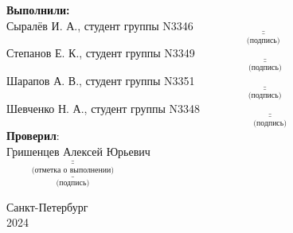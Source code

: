 \vfill
 \begin{flushright}
    \hfill \textbf{Выполнили:}\\
    \vspace{15pt}
    \noindent Сыралёв И. А., студент группы N3346 \hfill $\underset{\text{(подпись)}}{\underline{\underline{\hspace{5cm}}}}$\\
    \vspace{15pt}
    \noindent Степанов Е. К., студент группы N3349 \hfill $\underset{\text{(подпись)}}{\underline{\underline{\hspace{5cm}}}}$\\
    \vspace{15pt}
    \noindent Шарапов А. В., студент группы N3351 \hfill $\underset{\text{(подпись)}}{\underline{\underline{\hspace{5cm}}}}$\\
    \vspace{15pt}
    \noindent Шевченко Н. А., студент группы N3348 \hfill $\underset{\text{(подпись)}}{\underline{\underline{\hspace{5cm}}}}$\\
    \vspace{15pt}
    \textbf{Проверил}: \\
    \vspace{10pt}
    \hfill {Гришенцев Алексей Юрьевич}\\
    \vspace{10pt}
    $\underset{\text{(отметка о выполнении)}}{\underline{\underline{\hspace{5cm}}}}$\\
    \vspace{22pt}
    $\underset{\text{(подпись)}}{\underline{\hspace{5cm}}}$
 \end{flushright}
\vfill
\begin{center}
    Санкт-Петербург \\
    2024
\end{center}